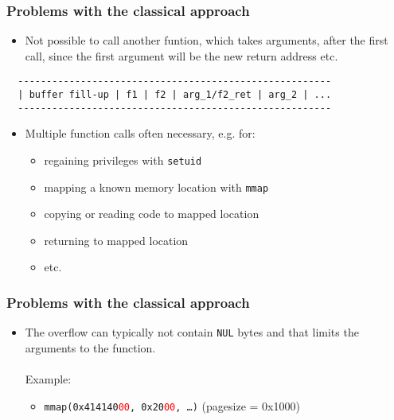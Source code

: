 \documentclass[10pt]{beamer}
\begin{document}
\begin{frame}[fragile]
  \frametitle{Problems with the classical approach}
  \begin{itemize}
    \item Not possible to call another funtion, which takes arguments, after
      the first call, since the first argument will be the new return address
      etc.
  \end{itemize}

  \begin{lstlisting}
  -------------------------------------------------------
  | buffer fill-up | f1 | f2 | arg_1/f2_ret | arg_2 | ...
  -------------------------------------------------------
  \end{lstlisting}

  \begin{itemize}
    \item Multiple function calls often necessary, e.g. for:
      \begin{itemize}
        \item regaining privileges with \texttt{setuid}
        \item mapping a known memory location with \texttt{mmap}
        \item copying or reading code to mapped location
        \item returning to mapped location
        \item etc.
      \end{itemize}
  \end{itemize}

\end{frame}

\begin{frame}
  \frametitle{Problems with the classical approach}
  \begin{itemize}
    \item The overflow can typically not contain \texttt{NUL} bytes and that
      limits the arguments to the function.\\
      \hfill\\
      Example:
      \begin{itemize}
        \item \texttt{mmap(0x414140\textcolor{red}{00},
          0x20\textcolor{red}{00}, \dots)}
          \hfill (pagesize = 0x1000)
      \end{itemize}
  \end{itemize}
\end{frame}
\end{document}
